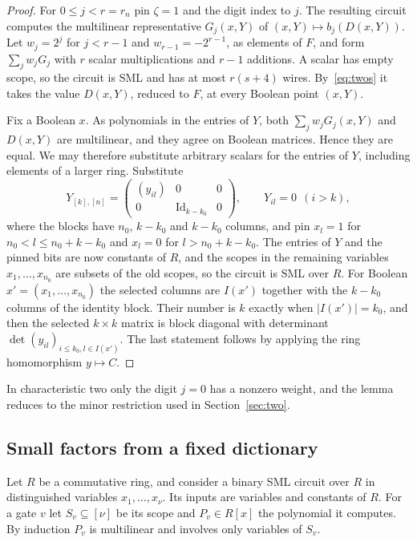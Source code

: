 \documentclass[11pt]{article}
\theoremstyle{remark}
\begin{document}
\begin{proof}
For \(0\le j<r=r_n\) pin \(\zeta=1\) and the digit index to \(j\). The
resulting circuit computes the multilinear representative \(G_j(x,Y)\) of
\((x,Y)\mapsto b_j(D(x,Y))\). Let \(w_j=2^j\) for \(j<r-1\) and
\(w_{r-1}=-2^{r-1}\), as elements of \(F\), and form
\(\sum_jw_jG_j\) with \(r\) scalar multiplications and \(r-1\) additions.
A scalar has empty scope, so the circuit is SML and has at most \(r(s+4)\)
wires. By~\eqref{eq:twos} it takes the value \(D(x,Y)\), reduced to
\(F\), at every Boolean point \((x,Y)\).

Fix a Boolean \(x\). As polynomials in the entries of \(Y\), both
\(\sum_jw_jG_j(x,Y)\) and \(D(x,Y)\) are multilinear, and they agree on
Boolean matrices. Hence they are equal. We may therefore substitute
arbitrary scalars for the entries of \(Y\), including elements of a
larger ring.
Substitute
\[
 Y_{[k],[n]}=\begin{pmatrix}(y_{il})&0&0\\0&\mathrm{Id}_{k-k_0}&0\end{pmatrix},
 \qquad Y_{il}=0\ \ (i>k),
\]
where the blocks have \(n_0\), \(k-k_0\) and \(k-k_0\) columns, and pin
\(x_l=1\) for \(n_0<l\le n_0+k-k_0\) and \(x_l=0\) for
\(l>n_0+k-k_0\). The entries of \(Y\) and the pinned bits are now
constants of \(R\), and the scopes in the remaining variables
\(x_1,\ldots,x_{n_0}\) are subsets of the old scopes, so the circuit is
SML over \(R\). For Boolean \(x'=(x_1,\ldots,x_{n_0})\) the selected
columns are \(I(x')\) together with the \(k-k_0\) columns of the identity
block. Their number is \(k\) exactly when \(|I(x')|=k_0\), and then the
selected \(k\times k\) matrix is block diagonal with determinant
\(\det(y_{il})_{i\le k_0,l\in I(x')}\). The last statement follows by
applying the ring homomorphism \(y\mapsto C\).
\end{proof}

In characteristic two only the digit \(j=0\) has a nonzero weight, and
the lemma reduces to the minor restriction used in
Section~\ref{sec:two}.

\subsection{Small factors from a fixed dictionary}\label{sec:dict}
Let \(R\) be a commutative ring, and consider a binary SML circuit over
\(R\) in distinguished variables \(x_1,\ldots,x_\nu\). Its inputs are
variables and constants of \(R\). For a gate \(v\) let
\(S_v\subseteq[\nu]\) be its scope and \(P_v\in R[x]\) the polynomial it
computes. By induction \(P_v\) is multilinear and involves only variables
of \(S_v\).
\end{document}
